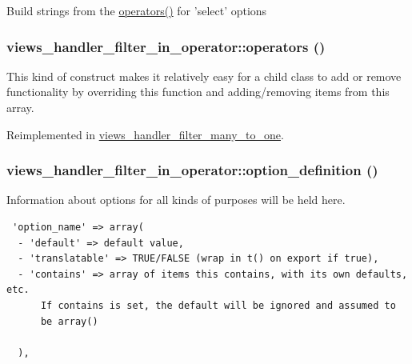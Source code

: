 Build strings from the \hyperlink{classviews__handler__filter__in__operator_e22d2c1d388a5b1457960c492ffc1fe1}{operators()} for 'select' options \hypertarget{classviews__handler__filter__in__operator_e22d2c1d388a5b1457960c492ffc1fe1}{
\subsubsection[{operators}]{\setlength{\rightskip}{0pt plus 5cm}views\_\-handler\_\-filter\_\-in\_\-operator::operators ()}}
\label{classviews__handler__filter__in__operator_e22d2c1d388a5b1457960c492ffc1fe1}


This kind of construct makes it relatively easy for a child class to add or remove functionality by overriding this function and adding/removing items from this array. 

Reimplemented in \hyperlink{classviews__handler__filter__many__to__one_e397d071d9f55b4053b88f01572e700f}{views\_\-handler\_\-filter\_\-many\_\-to\_\-one}.\hypertarget{classviews__handler__filter__in__operator_76892fbc2f6206e88d83925e187c4ab7}{
\subsubsection[{option\_\-definition}]{\setlength{\rightskip}{0pt plus 5cm}views\_\-handler\_\-filter\_\-in\_\-operator::option\_\-definition ()}}
\label{classviews__handler__filter__in__operator_76892fbc2f6206e88d83925e187c4ab7}


Information about options for all kinds of purposes will be held here. 

\begin{Code}\begin{verbatim} 'option_name' => array(
  - 'default' => default value,
  - 'translatable' => TRUE/FALSE (wrap in t() on export if true),
  - 'contains' => array of items this contains, with its own defaults, etc.
      If contains is set, the default will be ignored and assumed to
      be array()

  ),
\end{verbatim}
\end{Code}


